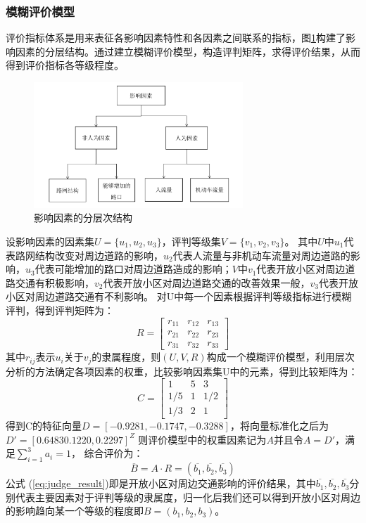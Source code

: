 \documentclass[fontset=windows,a4paper,12pt]{ctexart}
\renewcommand{\eqref}[1]{公式 (\ref{#1})}
\begin{document}
		\subsubsection{模糊评价模型}
			评价指标体系是用来表征各影响因素特性和各因素之间联系的指标，图\ref{fig:layer_struct}构建了影响因素的分层结构。通过建立模糊评价模型，构造评判矩阵，求得评价结果，从而得到评价指标各等级程度。
			\begin{figure}[!htbp]
				\centering
				\includegraphics[width=0.7\textwidth]{pic/judge_result.pdf}
				\caption{影响因素的分层次结构}
				\label{fig:layer_struct}
			\end{figure}
			设影响因素的因素集$ U=\{u_1,u_2,u_3\} $，评判等级集$ V=\{v_1,v_2,v_3\} $。
			其中$ U $中$ u_1 $代表路网结构改变对周边道路的影响，$ u_2 $代表人流量与非机动车流量对周边道路的影响，$ u_3 $代表可能增加的路口对周边道路造成的影响；$ V $中$ v_1 $代表开放小区对周边道路交通有积极影响，$ v_2 $代表开放小区对周边道路交通的改善效果一般，$ v_3 $代表开放小区对周边道路交通有不利影响。
			对U中每一个因素根据评判等级指标进行模糊评判，得到评判矩阵为：
			$$
				R=\left[
				\begin{array}{cccc}
					r_{11} & r_{12} & r_{13}\\
					r_{21} & r_{22} & r_{23}\\
					r_{31} & r_{32} & r_{33}
				\end{array}
				\right]
			$$
			其中$ r_{ij} $表示$ u_i $关于$ v_j $的隶属程度，则$ (U,V,R) $构成一个模糊评价模型，利用层次分析的方法确定各项因素的权重，比较影响因素集U中的元素，得到比较矩阵为：
			$$
				C=\left[
				\begin{array}{cccc}
					1 & 5 & 3\\
					1/5 & 1 & 1/2\\
					1/3 & 2 & 1
				\end{array}
				\right]
			$$
			得到C的特征向量$ D=[-0.9281,-0.1747,-0.3288] $，将向量标准化之后为$ D'=[0.6483 0.1220,0.2297]^Z $
			则评价模型中的权重因素记为$A$并且令$ A=D' $，满足$ \sum\limits_{i=1}^{3}a_i=1 $，
			综合评价为：
			\begin{equation}
				\overline{B}=A \cdot R=(\overline{b_1},\overline{b_2},\overline{b_3}) 
				\label{eq:judge_result}
			\end{equation}
			\eqref{eq:judge_result}即是开放小区对周边交通影响的评价结果，其中$\overline{b_1},\overline{b_2},\overline{b_3}$分
			别代表主要因素对于评判等级的隶属度，归一化后我们还可以得到开放小区对周边的影响趋向某一个等级的程度即$ B=(b_1,b_2,b_3) $。
\end{document}
